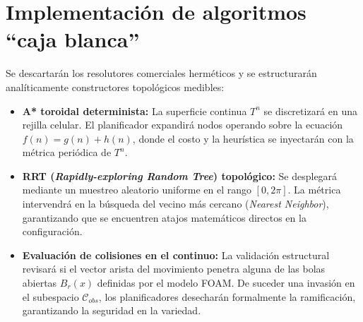 \section{Implementación de algoritmos \enquote{caja blanca}}
Se descartarán los resolutores comerciales herméticos y se estructurarán analíticamente constructores topológicos medibles: 
\begin{itemize}
    \item \textbf{A* toroidal determinista:} La superficie continua $T^n$ se discretizará en una rejilla celular. El planificador expandirá nodos operando sobre la ecuación $f(n) = g(n) + h(n)$, donde el costo y la heurística se inyectarán con la métrica periódica de $T^n$.
    
    \item \textbf{RRT (\textit{Rapidly-exploring Random Tree}) topológico:} Se desplegará mediante un muestreo aleatorio uniforme en el rango $[0, 2\pi]$. La métrica intervendrá en la búsqueda del vecino más cercano (\textit{Nearest Neighbor}), garantizando que se encuentren atajos matemáticos directos en la configuración.
    
    \item \textbf{Evaluación de colisiones en el continuo:} La validación estructural revisará si el vector arista del movimiento penetra alguna de las bolas abiertas $B_r(x)$ definidas por el modelo FOAM. De suceder una invasión en el subespacio $\mathcal{C}_{obs}$, los planificadores desecharán formalmente la ramificación, garantizando la seguridad en la variedad.
\end{itemize}

